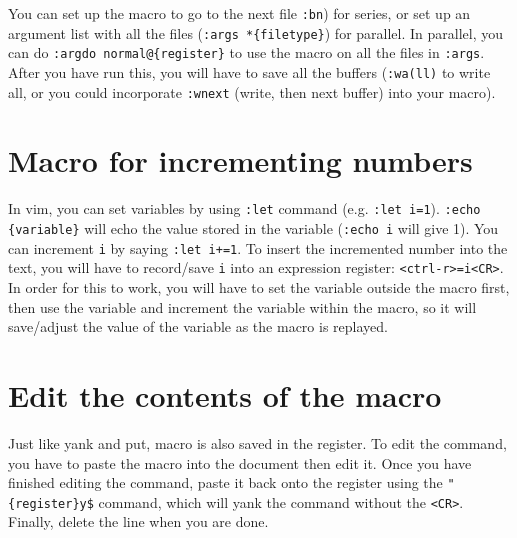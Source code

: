 You can set up the macro to go to the next file \verb|:bn|) for series, or set up an argument list with all the files (\verb|:args *{filetype}|) for parallel.
In parallel, you can do \verb|:argdo normal@{register}| to use the macro on all the files in \verb|:args|.
After you have run this, you will have to save all the buffers (\verb|:wa(ll)| to write all, or you could incorporate \verb|:wnext| (write, then next buffer) into your macro).

\section{Macro for incrementing numbers}

In vim, you can set variables by using \verb|:let| command (e.g. \verb|:let i=1|).
\verb|:echo {variable}| will echo the value stored in the variable (\verb|:echo i| will give 1).
You can increment \verb|i| by saying \verb|:let i+=1|.
To insert the incremented number into the text, you will have to record/save \verb|i| into an expression register: \verb|<ctrl-r>=i<CR>|.
In order for this to work, you will have to set the variable outside the macro first, then use the variable and increment the variable within the macro, so it will save/adjust the value of the variable as the macro is replayed.

\section{Edit the contents of the macro}

Just like yank and put, macro is also saved in the register.
To edit the command, you have to paste the macro into the document then edit it.
Once you have finished editing the command, paste it back onto the register using the \verb|"{register}y$| command, which will yank the command without the \verb|<CR>|.
Finally, delete the line when you are done.
